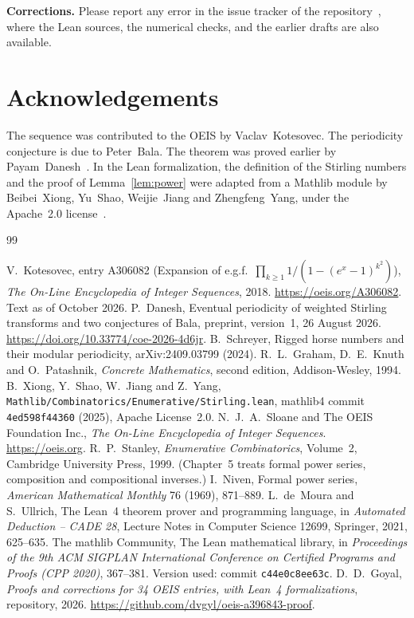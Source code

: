 \documentclass[11pt,a4paper]{article}
\theoremstyle{definition}
\theoremstyle{remark}
\newcommand{\para}[1]{\par\medskip\noindent\textbf{#1}\enspace}
\begin{document}
\para{Corrections.} Please report any error in the issue tracker of the repository~\cite{repo}, where the Lean
sources, the numerical checks, and the earlier drafts are also available.

\section*{Acknowledgements}
The sequence was contributed to the OEIS by Vaclav~Kotesovec. The periodicity conjecture is due to Peter~Bala. The theorem was proved earlier by
Payam~Danesh~\cite{danesh}. In the Lean formalization, the definition of the Stirling numbers and the proof of
Lemma~\ref{lem:power} were adapted from a Mathlib module by Beibei~Xiong, Yu~Shao, Weijie~Jiang and Zhengfeng~Yang, under
the Apache~2.0 license~\cite{stirlingmathlib}.

\begin{thebibliography}{99}\small
\raggedright
{} V.~Kotesovec, entry A306082 (Expansion of e.g.f.\ $\prod_{k\ge1}1/(1-(e^x-1)^{k^2})$), \emph{The On-Line Encyclopedia of Integer Sequences}, 2018. \url{https://oeis.org/A306082}. Text as of October 2026.
 P.~Danesh, Eventual periodicity of weighted Stirling transforms and two conjectures of Bala, preprint, version~1, 26 August 2026. \url{https://doi.org/10.33774/coe-2026-4d6jr}.
 B.~Schreyer, Rigged horse numbers and their modular periodicity, arXiv:2409.03799 (2024).
 R.~L.~Graham, D.~E.~Knuth and O.~Patashnik, \emph{Concrete Mathematics}, second edition, Addison-Wesley, 1994.
 B.~Xiong, Y.~Shao, W.~Jiang and Z.~Yang, \texttt{Mathlib/Combinatorics/Enumerative/Stirling.lean}, mathlib4 commit \texttt{4ed598f44360} (2025), Apache License~2.0.
 N.~J.~A.~Sloane and The OEIS Foundation Inc., \emph{The On-Line Encyclopedia of Integer Sequences}. \url{https://oeis.org}.
 R.~P.~Stanley, \emph{Enumerative Combinatorics}, Volume~2, Cambridge University Press, 1999. (Chapter~5 treats formal power series, composition and compositional inverses.)
 I.~Niven, Formal power series, \emph{American Mathematical Monthly} 76 (1969), 871--889.
 L.~de~Moura and S.~Ullrich, The Lean~4 theorem prover and programming language, in \emph{Automated Deduction -- CADE 28}, Lecture Notes in Computer Science 12699, Springer, 2021, 625--635.
 The mathlib Community, The Lean mathematical library, in \emph{Proceedings of the 9th ACM SIGPLAN International Conference on Certified Programs and Proofs (CPP 2020)}, 367--381. Version used: commit \texttt{c44e0c8ee63c}.
 D.~D.~Goyal, \emph{Proofs and corrections for 34 OEIS entries, with Lean~4 formalizations}, repository, 2026. \url{https://github.com/dvgyl/oeis-a396843-proof}.
\end{thebibliography}
\end{document}
